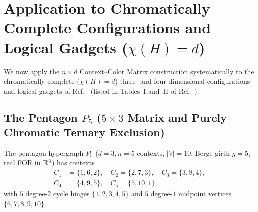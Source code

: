 \documentclass[aps,pra,reprint,superscriptaddress,longbibliography,nofootinbib,floatfix,10pt]{revtex4-2}
\theoremstyle{definition}\newtheorem{definition}[theorem]{Definition}
\theoremstyle{remark}\newtheorem{remark}[theorem]{Remark}
\begin{document}
\section{Application to Chromatically Complete Configurations and Logical Gadgets (\texorpdfstring{$\chi(H)=d$}{chi(H)=d})}\label{sec:exact-palette}

We now apply the $n\times d$ Context--Color Matrix construction systematically to the chromatically complete ($\chi(H)=d$) three- and four-dimensional configurations and logical gadgets of Ref.~\cite{svozil2026contexts} (listed in Tables~I and~II of Ref.~\cite{svozil2026contexts}).

\subsection{The Pentagon \texorpdfstring{$P_5$}{P5} (\texorpdfstring{$5\times 3$}{5x3} Matrix and Purely Chromatic Ternary Exclusion)}\label{sec:P5}

The pentagon hypergraph $P_5$ ($d=3,n=5$ contexts, $|V|=10$, Berge girth $g=5$, real FOR in $\mathbb R^3$) has contexts
\begin{equation}\label{eq:P5-contexts}
\begin{aligned}
C_1&=\{1,6,2\},\quad C_2=\{2,7,3\},\quad C_3=\{3,8,4\},\\
C_4&=\{4,9,5\},\quad C_5=\{5,10,1\},
\end{aligned}
\end{equation}
with $5$ degree-$2$ cycle hinges $\{1,2,3,4,5\}$ and $5$ degree-$1$ midpoint vertices $\{6,7,8,9,10\}$.
\end{document}
